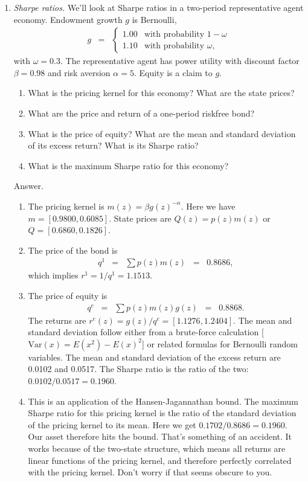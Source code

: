 \documentclass[11pt]{article}
\begin{document}
\begin{enumerate}
\item {\it Sharpe ratios.\/}
We'll look at Sharpe ratios in a two-period representative agent economy.
Endowment growth $g$ is Bernoulli,
\begin{eqnarray*}
    g &=&
        \left\{
        \begin{array}{ll}
            1.00    &  \mbox{with probability } 1-\omega \\
            1.10    &  \mbox{with probability } \omega ,
        \end{array}
        \right.
\end{eqnarray*}
with $\omega = 0.3$.
The representative agent has power utility with discount factor $\beta = 0.98$
and risk aversion $\alpha = 5$.
Equity is a claim to $g$.
%
\begin{enumerate}
\item What is the pricing kernel for this economy?
What are the state prices?
\item What are the price and return of a one-period riskfree bond?
\item What is the price of equity?
What are the mean and standard deviation of its excess return?
What is its Sharpe ratio?
\item What is the maximum Sharpe ratio for this economy?
\end{enumerate}
%
Answer.
\begin{enumerate}
\item The pricing kernel is $m(z) = \beta g(z)^{-\alpha} $.
Here we have $ m = [0.9800, 0.6085] $.
State prices are $Q(z) = p(z) m(z) $ or
$ Q = [ 0.6860, 0.1826]$.
\item The price of the bond is
\begin{eqnarray*}
    q^1 &=& \sum p(z) m(z) \;\;=\;\; 0.8686,
\end{eqnarray*}
which implies $r^1 = 1/q^1 = 1.1513$.
\item The price of equity is
\begin{eqnarray*}
    q^e &=& \sum p(z) m(z) g(z) \;\;=\;\; 0.8868 .
\end{eqnarray*}
The returns are $r^e(z) = g(z)/q^e =  [1.1276, 1.2404]$.
The mean and standard deviation follow either from
a brute-force calculation [$ \mbox{Var}(x) = E(x^2) - E(x)^2$]
or related formulas for Bernoulli random variables.
The mean and standard deviation of the excess return are
0.0102 and 0.0517.
The Sharpe ratio is the ratio of the two:  $0.0102/0.0517 = 0.1960$.
\item This is an application of the Hansen-Jagannathan bound.
The maximum Sharpe ratio for this pricing kernel is the ratio
of the standard deviation of the pricing kernel to its mean.
Here we get $0.1702/0.8686 = 0.1960$.
Our asset therefore hits the bound.
That's something of an accident.
It works because of the two-state structure,
which means all returns are linear functions of the pricing kernel,
and therefore perfectly correlated with the pricing kernel.
Don't worry if that seems obscure to you.
\end{enumerate}


\end{enumerate}
\end{document}
